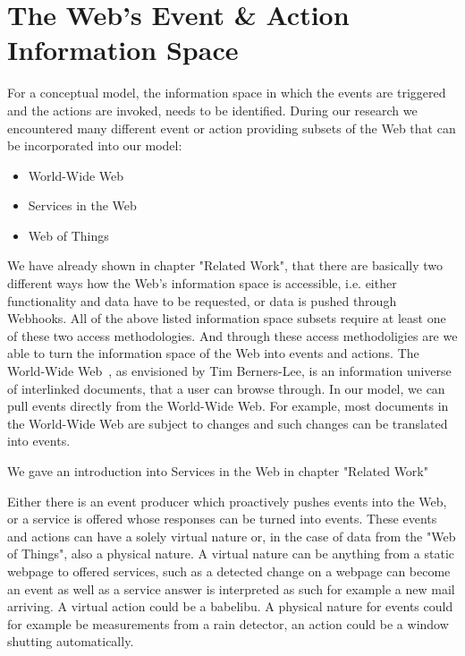 \section{The Web's Event \& Action Information Space}
For a conceptual model, the information space in which the events are triggered and the actions are invoked, needs to be identified.
During our research we encountered many different event or action providing subsets of the Web that can be incorporated into our model:
\begin{itemize}
  \item \textrm{World-Wide Web}
  \item \textrm{Services in the Web}
  \item \textrm{Web of Things}
\end{itemize}
We have already shown in chapter "Related Work", that there are basically two different ways how the Web's information space is accessible, i.e. either functionality and data have to be requested, or data is pushed through Webhooks.
All of the above listed information space subsets require at least one of these two access methodologies.
And through these access methodoligies are we able to turn the information space of the Web into events and actions.
The \textrm{World-Wide Web}~\cite{DBLP:journals/en/Berners-LeeCGP92}, as envisioned by Tim Berners-Lee, is an information universe of interlinked documents, that a user can browse through.
In our model, we can pull events directly from the World-Wide Web.
For example, most documents in the World-Wide Web are subject to changes and such changes can be translated into events.

We gave an introduction into \textrm{Services in the Web} in chapter "Related Work"


Either there is an event producer which proactively pushes events into the Web, or a service is offered whose responses can be turned into events.
These events and actions can have a solely virtual nature or, in the case of data from the \textrm{"Web of Things"}, also a physical nature.
A virtual nature can be anything from a static webpage to offered services, such as a detected change on a webpage can become an event as well as a service answer is interpreted as such for example a new mail arriving.
A virtual action could be a babelibu.
A physical nature for events could for example be measurements from a rain detector, an action could be a window shutting automatically.

